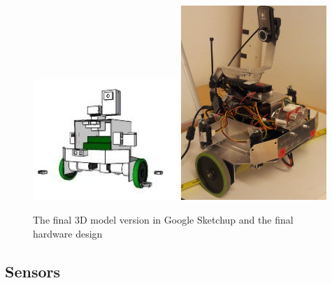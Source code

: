 \begin{figure}[h!]
    \begin{centering}
   	 \includegraphics[width=0.49\textwidth]{figures/g_sketchup_v7.jpeg}
   	 \includegraphics[width=0.49\textwidth]{figures/amee_final.jpg}
   	 \caption{The final 3D model version in Google Sketchup and the final hardware design}
   	 \label{fig:google_sketchup_draw1}
    \end{centering}
\end{figure}


\subsection{Sensors}

